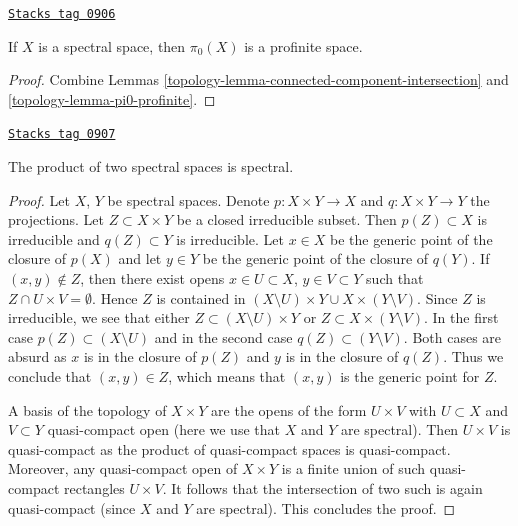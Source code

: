 \begin{lemma}[Spectral pi0]
\label{topology-lemma-spectral-pi0}
\href{https://stacks.math.columbia.edu/tag/0906}{\texttt{Stacks tag 0906}}

If $X$ is a spectral space, then $\pi_0(X)$ is a profinite space.
\end{lemma}

\begin{proof}

Combine Lemmas \ref{topology-lemma-connected-component-intersection} and
\ref{topology-lemma-pi0-profinite}.
\end{proof}

\begin{lemma}
\label{topology-lemma-product-spectral-spaces}
\href{https://stacks.math.columbia.edu/tag/0907}{\texttt{Stacks tag 0907}}

The product of two spectral spaces is spectral.
\end{lemma}

\begin{proof}
Let $X$, $Y$ be spectral spaces. Denote $p : X \times Y \to X$ and
$q : X \times Y \to Y$ the projections. Let $Z \subset X \times Y$ be a
closed irreducible subset. Then $p(Z) \subset X$ is irreducible
and $q(Z) \subset Y$ is irreducible. Let $x \in X$ be the generic
point of the closure of $p(X)$ and let $y \in Y$ be the generic
point of the closure of $q(Y)$. If $(x, y) \not \in Z$, then
there exist opens $x \in U \subset X$, $y \in V \subset Y$ such
that $Z \cap U \times V = \emptyset$. Hence $Z$ is contained
in $(X \setminus U) \times Y \cup X \times (Y \setminus V)$.
Since $Z$ is irreducible, we see that either
$Z \subset (X \setminus U) \times Y$ or $Z \subset X \times (Y \setminus V)$.
In the first case $p(Z) \subset (X \setminus U)$ and in the
second case $q(Z) \subset (Y \setminus V)$. Both cases are absurd
as $x$ is in the closure of $p(Z)$ and $y$ is in the closure of
$q(Z)$. Thus we conclude that $(x, y) \in Z$, which means that
$(x, y)$ is the generic point for $Z$.

\medskip\noindent
A basis of the topology of $X \times Y$ are the opens of the form
$U \times V$ with $U \subset X$ and $V \subset Y$ quasi-compact open
(here we use that $X$ and $Y$ are spectral). Then $U \times V$ is
quasi-compact as the product of quasi-compact spaces is quasi-compact.
Moreover, any quasi-compact open of $X \times Y$ is a finite union
of such quasi-compact rectangles $U \times V$. It follows that
the intersection of two such is again quasi-compact
(since $X$ and $Y$ are spectral). This concludes the proof.
\end{proof}

